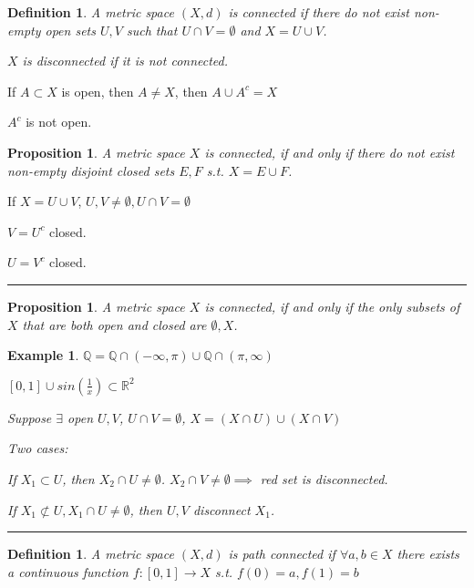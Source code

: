 \documentclass[twoside]{article}
\newcommand{\Q}{\mathbb{Q}}
\newtheorem{proposition}[theorem]{Proposition}
\newtheorem{definition}[theorem]{Definition}
\newtheorem{example}[theorem]{Example}
\newenvironment{proof}{{\bf Proof:}}{\hfill\rule{2mm}{2mm}}
\newcommand\R{\mathbb{R}}
\begin{document}
\begin{definition}
    A metric space $(X,d)$ is connected if there do not exist non-empty open sets $U,V$ such that $U \cap V = \emptyset$ and $X = U \cup V$. 

    $X$ is disconnected if it is not connected. 
\end{definition}


If $A \subset X$ is open, then $A \neq X$, then $A \cup A^c = X$

$A^c$ is not open. 

\begin{proposition}
    A metric space $X$ is connected, if and only if there do not exist non-empty disjoint closed sets $E,F$ s.t. $X = E \cup F$. 
\end{proposition}


\begin{proof}
    If $X = U \cup V$, $U, V \neq \emptyset, U \cap V = \emptyset$

    $V = U^c$ closed. 

    $U = V^c$ closed. 
\end{proof}

\begin{proposition}
    A metric space $X$ is connected, if and only if the only subsets of $X$ that are both open and closed are $\emptyset, X$. 
\end{proposition}

\begin{example}
    $\Q = \Q \cap (-\infty, \pi) \cup \Q \cap (\pi, \infty)$

    $[0,1] \cup sin(\frac1x) \subset \R^2$

    \begin{proof}
        Suppose $\exists$ open $U, V$, $U \cap V = \emptyset$, $X =( X\cap U) \cup (X\cap V)$

        Two cases:

        If $X_1 \subset U$, then $X_2 \cap U \neq \emptyset$. $X_2 \cap V \neq \emptyset \implies $ red set is disconnected.

        If $X_1 \not\subset U, X_1 \cap U \neq \emptyset$, then $U, V$ disconnect $X_1$. 
    \end{proof}

\end{example}

\begin{definition}
    A metric space $(X,d)$ is path connected if $\forall a, b \in X$ there exists a continuous function $f:[0,1]\rightarrow X$ s.t. $f(0) = a, f(1) = b$
\end{definition}
\end{document}
